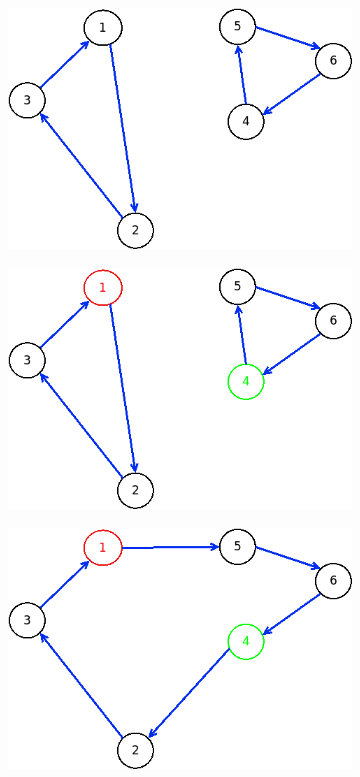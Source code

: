 \begin{figure}[!h]
	\begin{subfigure}{.26\columnwidth}
		\includegraphics[width=\columnwidth]{img/patching_merge1.png}
		\caption{}
		\label{fig:patching_merge1}
	\end{subfigure}
	\hfill%
	\begin{subfigure}{.26\columnwidth}
		\includegraphics[width=\columnwidth]{img/patching_merge2.png}
		\caption{}
		\label{fig:patching_merge2}
	\end{subfigure}
	\hfill%
	\begin{subfigure}{.26\columnwidth}
		\includegraphics[width=\columnwidth]{img/patching_merge3.png}

\end{subfigure}
\end{figure}
